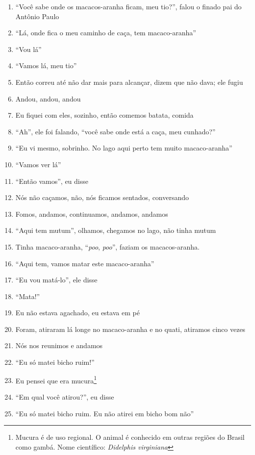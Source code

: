 \begin{enumerate}
 \item ``Você sabe onde os macacos-aranha ficam, meu tio?'', falou o finado pai do Antônio Paulo
 \item ``Lá, onde fica o meu caminho de caça, tem macaco-aranha''
 \item ``Vou lá''
 \item ``Vamos lá, meu tio''
 \item Então correu até não dar mais para alcançar, dizem que não dava; ele fugiu
 \item Andou, andou, andou
 \item Eu fiquei com eles, sozinho, então comemos batata, comida
 \item ``Ah'', ele foi falando, ``você sabe onde está a caça, meu cunhado?''
 \item ``Eu vi mesmo, sobrinho. No lago aqui perto tem muito macaco-aranha''
 \item ``Vamos ver lá''
 \item ``Então vamos'', eu disse
 \item Nós não caçamos, não, nós ficamos sentados, conversando
 \begin{center}\end{center}
 \item Fomos, andamos, continuamos, andamos, andamos
 \item ``Aqui tem mutum'', olhamos, chegamos no lago, não tinha mutum
 \item Tinha macaco-aranha, ``\textit{poo}, \textit{poo}'', faziam os
 macacos-aranha. 
 \item ``Aqui tem, vamos matar este macaco-aranha''
 \item ``Eu vou matá-lo'', ele disse
 \item ``Mata!''
 \item Eu não estava agachado, eu estava em pé
 \item Foram, atiraram lá longe no macaco-aranha e no quati, atiramos cinco
 vezes
 \item Nós nos reunimos e andamos
 \begin{center}\end{center}
 \item ``Eu só matei bicho ruim!''
 \item Eu pensei que era mucura\footnote{Mucura é de uso regional. O animal
   é conhecido em outras regiões do Brasil como gambá. Nome científico:
   \textit{Didelphis virginiana}}
 \item ``Em qual você atirou?'', eu disse
 \item ``Eu só matei bicho ruim. Eu não atirei em bicho bom não''

\end{enumerate}
